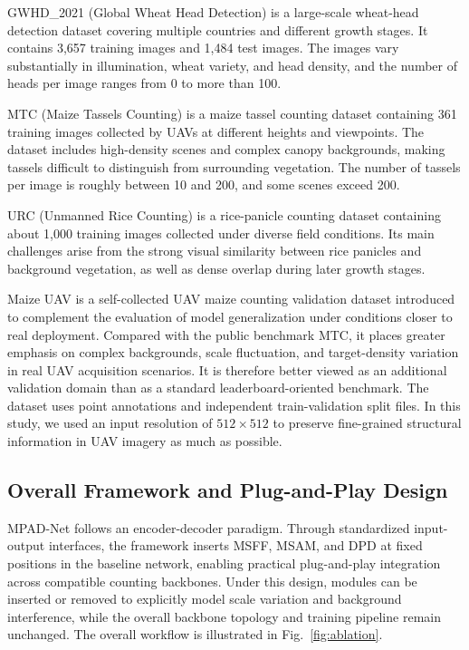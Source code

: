 \documentclass[a4paper,fleqn]{cas-sc}
\begin{document}
	GWHD\_2021 (Global Wheat Head Detection) \cite{ref2} is a large-scale wheat-head detection dataset covering multiple countries and different growth stages. It contains 3,657 training images and 1,484 test images. The images vary substantially in illumination, wheat variety, and head density, and the number of heads per image ranges from 0 to more than 100.
	
	MTC (Maize Tassels Counting) \cite{ref4} is a maize tassel counting dataset containing 361 training images collected by UAVs at different heights and viewpoints. The dataset includes high-density scenes and complex canopy backgrounds, making tassels difficult to distinguish from surrounding vegetation. The number of tassels per image is roughly between 10 and 200, and some scenes exceed 200.
	
	URC (Unmanned Rice Counting) \cite{ref5} is a rice-panicle counting dataset containing about 1,000 training images collected under diverse field conditions. Its main challenges arise from the strong visual similarity between rice panicles and background vegetation, as well as dense overlap during later growth stages.
	
	Maize UAV is a self-collected UAV maize counting validation dataset introduced to complement the evaluation of model generalization under conditions closer to real deployment. Compared with the public benchmark MTC, it places greater emphasis on complex backgrounds, scale fluctuation, and target-density variation in real UAV acquisition scenarios. It is therefore better viewed as an additional validation domain than as a standard leaderboard-oriented benchmark. The dataset uses point annotations and independent train-validation split files. In this study, we used an input resolution of $512\times512$ to preserve fine-grained structural information in UAV imagery as much as possible.
	
	\subsection{Overall Framework and Plug-and-Play Design}
	
	MPAD-Net follows an encoder-decoder paradigm. Through standardized input-output interfaces, the framework inserts MSFF, MSAM, and DPD at fixed positions in the baseline network, enabling practical plug-and-play integration across compatible counting backbones. Under this design, modules can be inserted or removed to explicitly model scale variation and background interference, while the overall backbone topology and training pipeline remain unchanged. The overall workflow is illustrated in Fig.~\ref{fig:ablation}.
	
\end{document}
